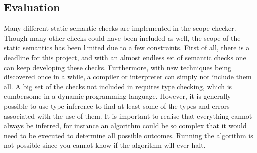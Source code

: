 \subsection{Evaluation}
Many different static semantic checks are implemented in the scope checker.
Though many other checks could have been included as well, the scope of the
static semantics has been limited due to a few constraints. First of all, there
is a deadline for this project, and with an almost endless set of semantic
checks one can keep developing these checks. Furthermore, with new techniques
being discovered once in a while, a compiler or interpreter can simply not
include them all. A big set of the checks not included in \productname{}
requires type checking, which is cumbersome in a dynamic programming language.
However, it is generally possible to use type inference to find at least some of
the types and errors associated with the use of them. It is important to realise
that everything cannot always be inferred, for instance an algorithm could be so
complex that it would need to be executed to determine all possible outcomes.
Running the algorithm is not possible since you cannot know if the algorithm
will ever halt.
\cite[p. 173]{itttoc}
